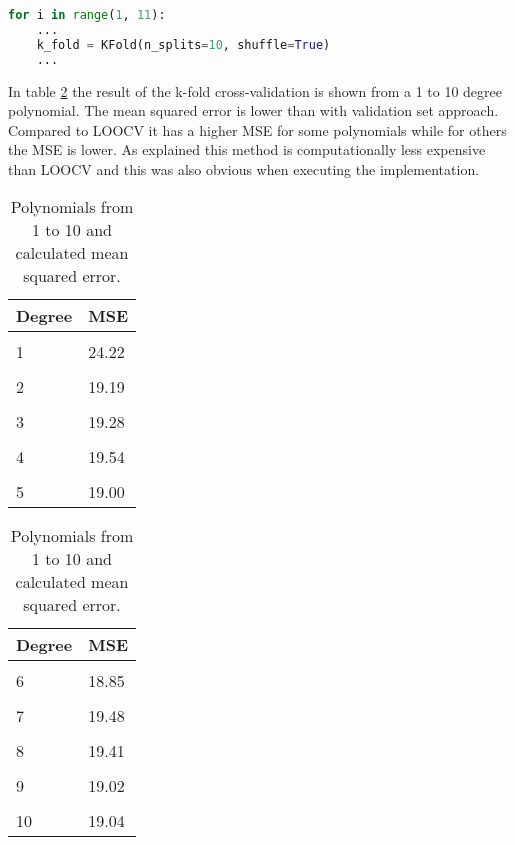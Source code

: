 \begin{lstlisting}[language=Python, label=lst:K_fold, caption=K-fold cross-validation loop]
for i in range(1, 11):
	...
	k_fold = KFold(n_splits=10, shuffle=True) 
	...
\end{lstlisting}
\FloatBarrier

In table \ref{table:kfold_polynomials_mse} the result of the k-fold cross-validation is shown from a 1 to 10 degree polynomial. The mean squared error is lower than with validation set approach. Compared to LOOCV it has a higher MSE for some polynomials while for others the MSE is lower. As explained this method is computationally less expensive than LOOCV and this was also obvious when executing the implementation.

\begin{table}[htbp]
	\centering
	\begin{subtable}[t]{2in}
		\centering
		\begin{tabular}{ p{2.5cm} p{1.5cm}  }
			\textbf{Degree} & \textbf{MSE} \\
			\hline 
			\\
			1 & 24.22 \\\hline
			\\
			2 & 19.19 \\\hline
			\\
			3 & 19.28 \\\hline
			\\
			4 & 19.54  \\\hline
			\\
			5 & 19.00  \\\hline
		\end{tabular}
		\label{table:mse_validation}
	\end{subtable}
	\quad 
	\begin{subtable}[t]{2in}
		\centering
		\begin{tabular}{ p{2.5cm} p{1.5cm}  }
			\textbf{Degree} & \textbf{MSE} \\
			\hline 
			\\
			6 & 18.85 \\\hline
			\\
			7 & 19.48  \\\hline
			\\
			8 & 19.41  \\\hline
			\\
			9 & 19.02  \\\hline
			\\
			10 & 19.04  \\\hline
		\end{tabular}
		\label{table:mse_cross}
	\end{subtable}
	\caption{Polynomials from 1 to 10 and calculated mean squared error.}\label{table:kfold_polynomials_mse}
\end{table}


